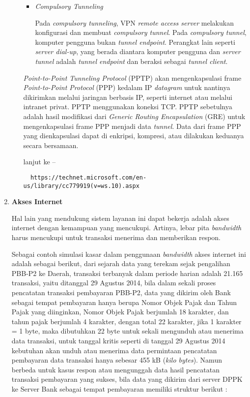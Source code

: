 \documentclass[pdftex,12pt, oneside]{article}
\begin{document}
\begin{enumerate}
\begin{enumerate}
\begin{itemize}
    \item \textit{Compulsory Tunneling}
    
    Pada \textit{compulsory tunneling}, VPN \textit{remote access server} melakukan konfigurasi dan membuat \textit{compulsory tunnel}. Pada \textit{compulsory tunnel}, komputer pengguna bukan \textit{tunnel endpoint}. Perangkat lain seperti \textit{server dial-up}, yang berada diantara komputer pengguna dan \textit{server tunnel} adalah \textit{tunnel endpoint} dan beraksi sebagai \textit{tunnel client}.
  \end{itemize}
  
  \textit{Point-to-Point Tunneling Protocol} (PPTP) akan mengenkapsulasi frame \textit{Point-to-Point Protocol} (PPP) kedalam IP \textit{datagram} untuk nantinya dikirimkan melalui jaringan berbasis IP, seperti internet atau melalui intranet privat. PPTP menggunakan koneksi TCP. PPTP sebetulnya adalah hasil modifikasi dari \textit{Generic Routing Encapsulation} (GRE) untuk mengenkapsulasi frame PPP menjadi data \textit{tunnel}. Data dari frame PPP yang dienkapsulasi dapat di enkripsi, kompresi, atau dilakukan keduanya secara bersamaan.
  
  lanjut ke --
  
  \begin{verbatim}
  https://technet.microsoft.com/en-us/library/cc779919(v=ws.10).aspx
  \end{verbatim}
  
\end{enumerate}

\item \textbf{Akses Internet}

Hal lain yang mendukung sistem layanan ini dapat bekerja adalah akses internet dengan kemampuan yang mencukupi. Artinya, lebar pita \textit{bandwidth} harus mencukupi untuk transaksi menerima dan memberikan respon.

Sebagai contoh simulasi kasar dalam penggunaan \textit{bandwidth} akses internet ini adalah sebagai berikut, dari sejarah data yang terekam sejak pengalihan PBB-P2 ke Daerah, transaksi terbanyak dalam periode harian adalah 21.165 transaksi, yaitu ditanggal 29 Agustus 2014, bila dalam sekali proses pencatatan transaksi pembayaran PBB-P2, data yang dikirim oleh Bank sebagai tempat pembayaran hanya berupa Nomor Objek Pajak dan Tahun Pajak yang diinginkan, Nomor Objek Pajak berjumlah 18 karakter, dan tahun pajak berjumlah 4 karakter, dengan total 22 karakter, jika 1 karakter = 1 byte, maka dibutuhkan 22 byte untuk sekali mengunduh atau menerima data transaksi, untuk tanggal kritis seperti di tanggal 29 Agustus 2014 kebutuhan akan unduh atau menerima data permintaan pencatatan pembayaran data transaksi hanya sebesar 455 kB (\textit{kilo bytes}). Namun berbeda untuk kasus respon atau mengunggah data hasil pencatatan transaksi pembayaran yang sukses, bila data yang dikirim dari server DPPK ke Server Bank sebagai tempat pembayaran memiliki struktur berikut :


\end{enumerate}
\end{document}

